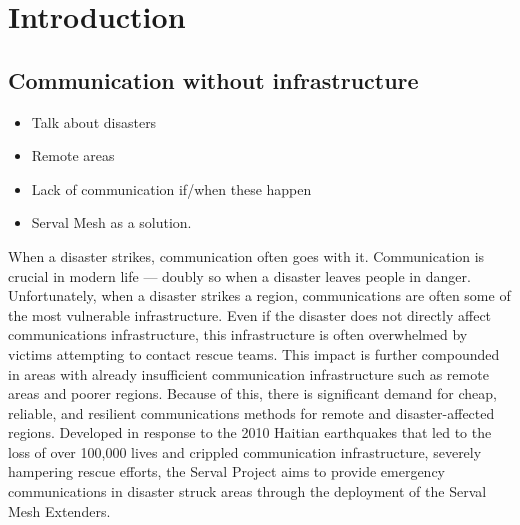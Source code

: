 
\chapter{Introduction}\label{chapter:firstchapter} %

\label{Chapter1} %

\section{Communication without infrastructure}
\begin{itemize}
    \item Talk about disasters
    \item Remote areas
    \item Lack of communication if/when these happen
    \item Serval Mesh as a solution.
\end{itemize}

When a disaster strikes, communication often goes with it.
Communication is crucial in modern life — doubly so when a disaster leaves people in danger.
Unfortunately, when a disaster strikes a region, communications are often some of the most vulnerable infrastructure.
Even if the disaster does not directly affect communications infrastructure, this infrastructure is often overwhelmed by victims attempting to contact rescue teams.
This impact is  further compounded in areas with already insufficient communication infrastructure such as remote areas and poorer regions.
Because of this, there is significant demand for cheap, reliable, and resilient communications methods for remote and disaster-affected regions.
Developed in response to the 2010 Haitian earthquakes that led to the loss of over 100,000 lives and crippled communication infrastructure, severely hampering rescue efforts, the Serval Project aims to provide emergency communications in disaster struck areas through the deployment of the Serval Mesh Extenders.

